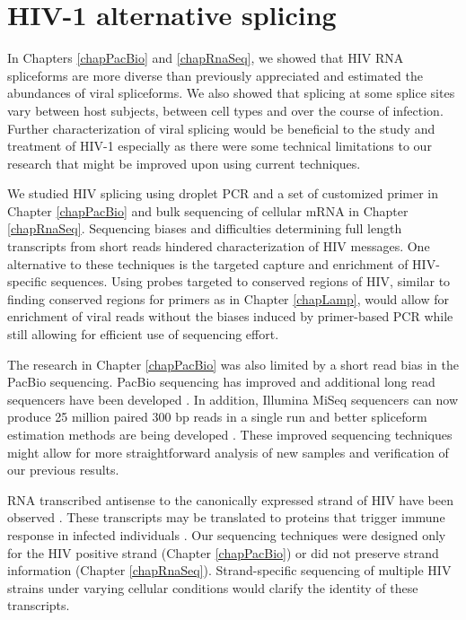\documentclass[../sherrill-Mix_thesis.tex]{subfiles}
\begin{document}
\section{HIV-1 alternative splicing}
	In Chapters \ref{chapPacBio} and \ref{chapRnaSeq}, we showed that HIV RNA spliceforms are more diverse than previously appreciated and estimated the abundances of viral spliceforms. We also showed that splicing at some splice sites vary between host subjects, between cell types and over the course of infection. Further characterization of viral splicing would be beneficial to the study and treatment of HIV-1 especially as there were some technical limitations to our research that might be improved upon using current techniques.
	
	We studied HIV splicing using droplet PCR \citep{Tewhey2009} and a set of customized primer in Chapter \ref{chapPacBio} and bulk sequencing of cellular mRNA in Chapter \ref{chapRnaSeq}. Sequencing biases and difficulties determining full length transcripts from short reads hindered characterization of HIV messages. One alternative to these techniques is the targeted capture and enrichment \citep{Depledge2011,Mercer2014} of HIV-specific sequences. Using probes targeted to conserved regions of HIV, similar to finding conserved regions for primers as in Chapter \ref{chapLamp}, would allow for enrichment of viral reads without the biases induced by primer-based PCR while still allowing for efficient use of sequencing effort.

	The research in Chapter \ref{chapPacBio} was also limited by a short read bias in the PacBio sequencing. PacBio sequencing has improved \citep{Mosher2014} and additional long read sequencers have been developed \citep{Mikheyev2014,Jain2015,Kilianski2015}. In addition, Illumina MiSeq sequencers can now produce 25 million paired 300 bp reads in a single run \citep{Juenemann2013,Illumina2015} and better spliceform estimation methods are being developed \citep{Rossell2014,Bray2015}. These improved sequencing techniques might allow for more straightforward analysis of new samples and verification of our previous results.

	RNA transcribed antisense to the canonically expressed strand of HIV have been observed \citep{Michael1994,Landry2007,Lefebvre2011,Schopman2012,Kobayashi-Ishihara2012,Saayman2014,Berger2015}. These transcripts may be translated to proteins \citep{Ludwig2006,Torresilla2013} that trigger immune response in infected individuals \citep{Ludwig2006,Bansal2010,Berger2015}.  Our sequencing techniques were designed only for the HIV positive strand (Chapter \ref{chapPacBio}) or did not preserve strand information (Chapter \ref{chapRnaSeq}). Strand-specific sequencing \citep{Levin2010,Podnar2014} of multiple HIV strains under varying cellular conditions would clarify the identity of these transcripts. 
	
\end{document}
